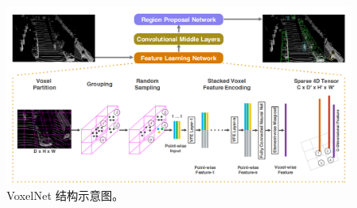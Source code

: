 \begin{figure}[!t]
	\centering
	\includegraphics[width=\textwidth]{./imgs/voxelnet.png}
	\caption{VoxelNet 结构示意图\cite{zhou2018voxelnet}。}
	\label{fig:voxelnet}
\end{figure}
